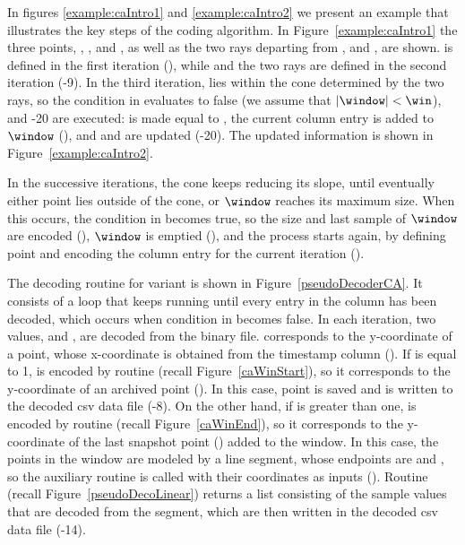In figures \ref{example:caIntro1} and \ref{example:caIntro2} we present an example that illustrates the key steps of the coding algorithm. In Figure~\ref{example:caIntro1} the three points, \archived, \snapshot, and \incoming, as well as the two rays departing from \archived, \smin and \smax, are shown. \archived is defined in the first iteration (), while \snapshot and the two rays are defined in the second iteration (-9). In the third iteration, \incoming lies within the cone determined by the two rays, so the condition in  evaluates to false (we assume that $|\window|<\win$), and -20 are executed: \snapshot is made equal to \incoming, the current column entry is added to $\window$ (), and \smin and \smax are updated (-20). The updated information is shown in Figure~\ref{example:caIntro2}. 


\exampleCA


\clearpage


In the successive iterations, the cone keeps reducing its slope, until eventually either point \incoming lies outside of the cone, or $\window$ reaches its maximum size. When this occurs, the condition in  becomes true, so the size and last sample of $\window$ are encoded (), $\window$ is emptied (), and the process starts again, by defining point \archived and encoding the column entry for the current iteration ().


The decoding routine for variant \maskalgo is shown in Figure~\ref{pseudoDecoderCA}. It consists of a loop that keeps running until every entry in the column has been decoded, which occurs when condition in  becomes false. In each iteration, two values, \sizee and , are decoded from the binary file.  corresponds to the y-coordinate of a point, whose x-coordinate is obtained from the timestamp column (). If \sizee is equal to 1,  is encoded by routine \CAWinStart (recall Figure~\ref{caWinStart}), so it corresponds to the y-coordinate of an archived point (\archived). In this case, point \archived is saved and  is written to the decoded csv data file (-8). On the other hand, if \sizee is greater than one,  is encoded by routine \CAWinEnd (recall Figure~\ref{caWinEnd}), so it corresponds to the y-coordinate of the last snapshot point (\snapshot) added to the window. In this case, the points in the window are modeled by a line segment, whose endpoints are \archived and \snapshot, so the auxiliary routine \decodeSegment is called with their coordinates as inputs (). Routine \decodeSegment (recall Figure~\ref{pseudoDecoLinear}) returns a list consisting of the sample values that are decoded from the segment, which are then written in the decoded csv data file (-14).


